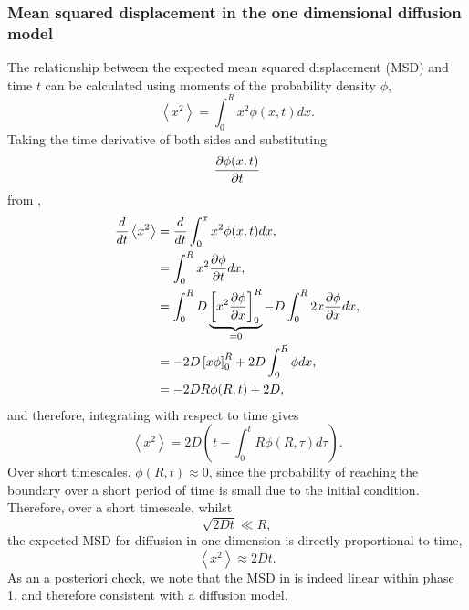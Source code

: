 \subsubsection{Mean squared displacement in the one dimensional diffusion model} \label{msd1d}
%
The relationship between the expected mean squared displacement (MSD) and time $t$
can be calculated using moments of the probability density $\phi$,
%
\begin{equation}
\left<x^2\right> = \int_0^R x^2 \phi(x,t) dx .
\label{eqn:MSD_expectation1d}
\end{equation}
%
Taking the time derivative of both sides and substituting
\begin{equation}
    \frac{\partial \phi(x,t)}{\partial t}
\end{equation} from ,
%
\begin{align}
\frac{d}{dt} \left<x^2\right> &= \frac{d}{dt}\int_0^x x^2 \phi(x,t) dx ,\nonumber\\
                           &= \int_0^{R}  x^2 \frac{\partial \phi}{\partial t} dx ,\nonumber\\
                           &= \int_0^{R} D \underbrace{\left[ x^2 \frac{\partial  \phi}{\partial  x} \right]_0^{R}}_{=0} - D \int_0^{R} 2x \frac{\partial \phi}{\partial x} dx, \nonumber\\
                            &= -2D \left[ x \phi \right]_0^{R} + 2D \int_0^{R} \phi dx , \nonumber\\
&= -2DR\phi(R,t) + 2D ,
\label{eqn:diffusion_1}
\end{align}
%
and therefore, integrating with respect to time gives
%
\begin{equation}
\left<x^2\right> = 2D \left( t - \int_0^t R \phi(R,\tau) d \tau \right).
\label{eqn:diffusion_msd1d}
\end{equation}
%
Over short timescales, $\phi(R,t) \approx 0$, since the probability of reaching the boundary over a short period of time is small due to the initial condition. Therefore, over a short timescale, whilst
%
\begin{equation}
\sqrt{2Dt} \ll R,
\end{equation}
%
the expected MSD for diffusion in one dimension is directly proportional to time,
%
\begin{equation}
\left<x^2\right> \approx 2Dt.
\label{eqn:diffusion_short1d}
\end{equation}
%
As an a posteriori check, we note that the MSD in  is indeed linear within phase 1, and therefore consistent with a diffusion model.

